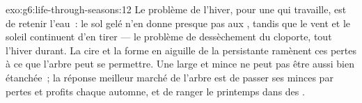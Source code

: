 \begin{solution}{exo:g6:life-through-seasons:12}
Le problème de l'hiver, pour une  qui travaille, est de
retenir l'eau~: le sol gelé n'en donne presque pas aux ,
tandis que le vent et le soleil continuent d'en tirer --- le
problème de dessèchement du cloporte, tout l'hiver durant. La cire
et la forme en aiguille de la  persistante ramènent ces
pertes à ce que l'arbre peut se permettre. Une  large et
mince ne peut pas être aussi bien étanchée~; la réponse meilleur
marché de l'arbre  est de passer ses  minces par pertes
et profits chaque automne, et de ranger le printemps dans des
.
\end{solution}

